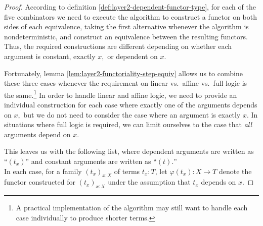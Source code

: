 \documentclass[a4paper]{article}
\theoremstyle{definition}
\theoremstyle{remark}
\renewcommand{\phi}{\varphi}
\begin{document}
\begin{proof}
  According to definition \ref{def:layer2-dependent-functor-type}, for each of the five combinators
  we need to execute the algorithm to construct a functor on both sides of each equivalence, taking
  the first alternative whenever the algorithm is nondeterministic, and construct an equivalence
  between the resulting functors. Thus, the required constructions are different depending on
  whether each argument is constant, exactly $x,$ or dependent on $x.$

  Fortunately, lemma \ref{lem:layer2-functoriality-step-equiv} allows us to combine these three
  cases whenever the requirement on linear vs.\ affine vs.\ full logic is the same.\footnote{A
  practical implementation of the algorithm may still want to handle each case individually to
  produce shorter terms.}
  In order to handle linear and affine logic, we need to provide an individual construction for each
  case where exactly one of the arguments depends on $x,$ but we do not need to consider the case
  where an argument is exactly $x.$ In situations where full logic is required, we can limit
  ourselves to the case that \emph{all} arguments depend on $x.$

  This leaves us with the following list, where dependent arguments are written as ``$(t_x)$'' and
  constant arguments are written as ``$(t).$''\\
  In each case, for a family $(t_x)_{x : X}$ of terms $t_x : T$, let $\phi(t_x) : X \to T$ denote
  the functor constructed for $(t_x)_{x : X}$ under the assumption that $t_x$ depends on $x.$


\end{proof}
\end{document}
